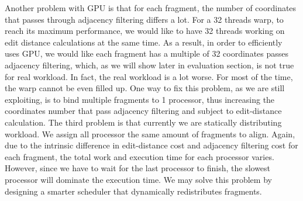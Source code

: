 Another problem with GPU is that for each fragment, the number of coordinates
that passes through adjacency filtering differs a lot. For a 32 threads warp,
to reach its maximum performance, we would like to have 32 threads working on
edit distance calculations at the same time. As a result, in order to
efficiently uses GPU, we would like each fragment has a multiple of 32
coordinates passes adjacency filtering, which, as we will show later in
evaluation section, is not true for real workload. In fact, the real workload
is a lot worse. For most of the time, the warp cannot be even filled up. One
way to fix this problem, as we are still exploiting, is to bind multiple
fragments to 1 processor, thus increasing the coordinates number that pass
adjacency filtering and subject to edit-distance calculation.  The third
problem is that currently we are statically distributing workload. We assign
all processor the same amount of fragments to align. Again, due to the
intrinsic difference in edit-distance cost and adjacency filtering cost for
each fragment, the total work and execution time for each processor varies.
However, since we have to wait for the last processor to finish, the slowest
processor will dominate the execution time. We may solve this problem by
designing a smarter scheduler that dynamically redistributes fragments.\\
